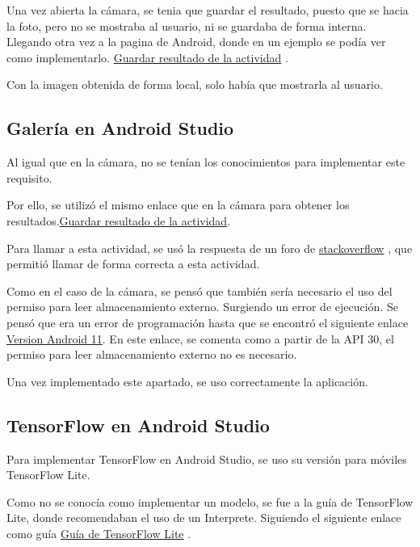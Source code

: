 Una vez abierta la cámara, se tenia que guardar el resultado, puesto que se hacia la foto, pero no se mostraba al usuario, ni se guardaba de forma interna. Llegando otra vez a la pagina de Android, donde en un ejemplo se podía ver como implementarlo.
\href{https://developer.android.com/training/basics/intents/result?hl=es-419}{Guardar resultado de la actividad} \cite{android-intents-result}. 

Con la imagen obtenida de forma local, solo había que mostrarla al usuario.

\subsection{Galería en Android Studio}

Al igual que en la cámara, no se tenían los conocimientos para implementar este requisito.

Por ello, se utilizó el mismo enlace que en la cámara para obtener los resultados.\href{https://developer.android.com/training/basics/intents/result?hl=es-419}{Guardar resultado de la actividad}\cite{android-intents-result}. 

Para llamar a esta actividad, se usó la respuesta de un foro de \href{https://stackoverflow.com/questions/38352148/get-image-from-the-gallery-and-show-in-imageview}{stackoverflow} \cite{stackoverflow-gallery-imageview}, que permitió llamar de forma correcta a esta actividad.

Como en el caso de la cámara, se pensó que también sería necesario el uso del permiso para leer almacenamiento externo. Surgiendo un error de ejecución. Se pensó que era un error de programación hasta que se encontró el siguiente enlace \href{https://developer.android.com/about/versions/11/privacy/storage?hl=es-419}{Version Android 11}\cite{android-storage-privacy}. En este enlace, se comenta como a partir de la API 30, el permiso para leer almacenamiento externo no es necesario.

Una vez implementado este apartado, se uso correctamente la aplicación.

\subsection{TensorFlow en Android Studio}

Para implementar TensorFlow en Android Studio, se uso su versión para móviles TensorFlow Lite.

Como no se conocía como implementar un modelo, se fue a la guía de TensorFlow Lite, donde recomendaban el uso de un Interprete.
Siguiendo el siguiente enlace como guía \href{https://www.tensorflow.org/lite/guide/inference?hl=es-419}{Guía de TensorFlow Lite} \cite{tensorflow-lite-guide}.

